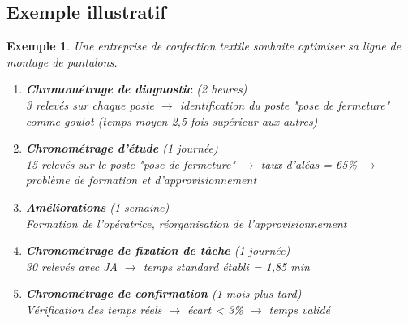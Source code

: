 \documentclass[a4paper,12pt]{article}
\newtheorem{exemple}{Exemple}[section]
\begin{document}
\begin{center}
\end{center}

\subsection{Exemple illustratif}

\begin{exemple}
Une entreprise de confection textile souhaite optimiser sa ligne de montage de pantalons.

\begin{enumerate}
    \item \textbf{Chronométrage de diagnostic} (2 heures) \\
    3 relevés sur chaque poste $\rightarrow$ identification du poste "pose de fermeture" comme goulot (temps moyen 2,5 fois supérieur aux autres)
    
    \item \textbf{Chronométrage d'étude} (1 journée) \\
    15 relevés sur le poste "pose de fermeture" $\rightarrow$ taux d'aléas = 65\% $\rightarrow$ problème de formation et d'approvisionnement
    
    \item \textbf{Améliorations} (1 semaine) \\
    Formation de l'opératrice, réorganisation de l'approvisionnement
    
    \item \textbf{Chronométrage de fixation de tâche} (1 journée) \\
    30 relevés avec JA $\rightarrow$ temps standard établi = 1,85 min
    
    \item \textbf{Chronométrage de confirmation} (1 mois plus tard) \\
    Vérification des temps réels $\rightarrow$ écart < 3\% $\rightarrow$ temps validé
\end{enumerate}
\end{exemple}
\end{document}

